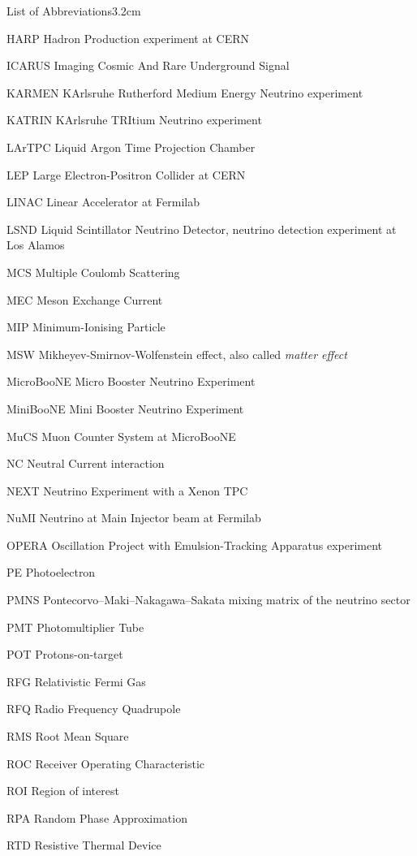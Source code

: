 \begin{mclistof}{List of Abbreviations}{3.2cm}
\item[HARP] Hadron Production experiment at CERN
\item[ICARUS] Imaging Cosmic And Rare Underground Signal
\item[KARMEN] KArlsruhe Rutherford Medium Energy Neutrino experiment
\item[KATRIN] KArlsruhe TRItium Neutrino experiment
\item[LArTPC] Liquid Argon Time Projection Chamber
\item[LEP] Large Electron-Positron Collider at CERN
\item[LINAC] Linear Accelerator at Fermilab
\item[LSND] Liquid Scintillator Neutrino Detector, neutrino detection experiment at Los Alamos
\item[MCS] Multiple Coulomb Scattering
\item[MEC] Meson Exchange Current
\item[MIP] Minimum-Ionising Particle
\item[MSW] Mikheyev-Smirnov-Wolfenstein effect, also called \emph{matter effect}
\item[MicroBooNE] Micro Booster Neutrino Experiment
\item[MiniBooNE] Mini Booster Neutrino Experiment
\item[MuCS] Muon Counter System at MicroBooNE
\item[NC] Neutral Current interaction
\item[NEXT] Neutrino Experiment with a Xenon TPC
\item[NuMI] Neutrino at Main Injector beam at Fermilab
\item[OPERA] Oscillation Project with Emulsion-Tracking Apparatus experiment
\item[PE] Photoelectron
\item[PMNS] Pontecorvo–Maki–Nakagawa–Sakata mixing matrix of the neutrino sector
\item[PMT] Photomultiplier Tube
\item[POT] Protons-on-target
\item[RFG] Relativistic Fermi Gas
\item[RFQ] Radio Frequency Quadrupole
\item[RMS] Root Mean Square
\item[ROC] Receiver Operating Characteristic
\item[ROI] Region of interest
\item[RPA] Random Phase Approximation
\item[RTD] Resistive Thermal Device

\end{mclistof}

